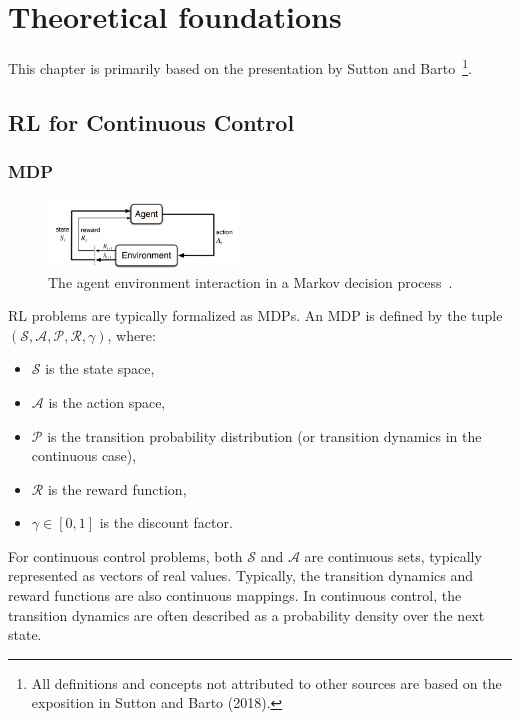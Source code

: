 \section{Theoretical foundations}

This chapter is primarily based on the presentation by Sutton and Barto~\cite{Sutton2018}\footnote{All definitions and concepts not attributed to other sources are based on the exposition in Sutton and Barto (2018).}.

\subsection{\gls{RL} for Continuous Control}

\subsubsection{\gls{MDP}}

\begin{figure}[H] %
    \centering
    \includegraphics[width=0.45\textwidth]{MDP.png} %
    \caption{The agent environment interaction in a Markov decision process~\cite{Sutton2018}.}
    \label{fig:first} %
\end{figure}
\gls{RL} problems are typically formalized as \gls{MDP}s. An \gls{MDP} is defined by the tuple $(\mathcal{S}, \mathcal{A}, \mathcal{P}, \mathcal{R}, \gamma)$, where:

\begin{itemize}
    \item $\mathcal{S}$ is the state space,
    \item $\mathcal{A}$ is the action space,
    \item $\mathcal{P}$ is the transition probability distribution (or transition dynamics in the continuous case),
    \item $\mathcal{R}$ is the reward function,
    \item $\gamma \in [0,1]$ is the discount factor.
\end{itemize}

\noindent For continuous control problems, both $\mathcal{S}$ and $\mathcal{A}$ are continuous sets, typically represented as vectors of real values. Typically, the transition dynamics and reward functions are also continuous mappings. In continuous control, the transition dynamics are often described as a probability density over the next state.

